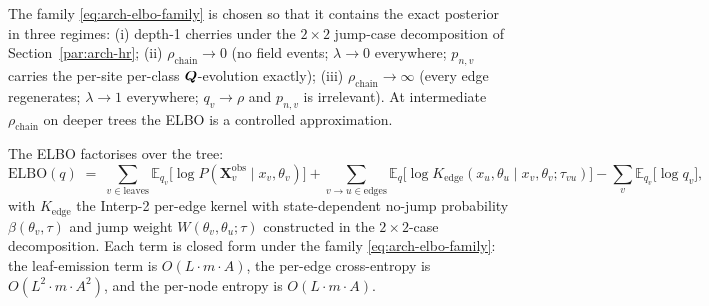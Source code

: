 The family \eqref{eq:arch-elbo-family} is chosen so that it contains
the exact posterior in three regimes: (i) depth-1 cherries under the
$2 \times 2$ jump-case decomposition of
Section~\ref{par:arch-hr}; (ii) $\rho_{\text{chain}} \to 0$ (no field
events; $\lambda \to 0$ everywhere; $p_{n, v}$ carries the per-site
per-class $\bm{Q}$-evolution exactly); (iii) $\rho_{\text{chain}} \to
\infty$ (every edge regenerates; $\lambda \to 1$ everywhere; $q_v \to
\rho$ and $p_{n, v}$ is irrelevant). At intermediate
$\rho_{\text{chain}}$ on deeper trees the ELBO is a controlled
approximation.

The ELBO factorises over the tree:
\begin{equation}
  \mathrm{ELBO}(q) \;=\;
    \sum_{v \in \mathrm{leaves}} \mathbb{E}_{q_v}\bigl[\log P(\mathbf{X}^{\mathrm{obs}}_v \mid x_v, \theta_v)\bigr]
    + \sum_{v \to u \in \mathrm{edges}} \mathbb{E}_q\bigl[\log K_{\mathrm{edge}}(x_u, \theta_u \mid x_v, \theta_v; \tau_{vu})\bigr]
    - \sum_{v} \mathbb{E}_{q_v}\bigl[\log q_v\bigr],
  \label{eq:arch-elbo-total}
\end{equation}
with $K_{\mathrm{edge}}$ the Interp-2 per-edge kernel with
state-dependent no-jump probability $\beta(\theta_v, \tau)$ and jump
weight $W(\theta_v, \theta_u; \tau)$ constructed in the
$2\times 2$-case decomposition. Each term is closed form under the
family \eqref{eq:arch-elbo-family}: the leaf-emission term is
$O(L \cdot m \cdot A)$, the per-edge cross-entropy is $O(L^2
\cdot m \cdot A^2)$, and the per-node entropy is $O(L \cdot
m \cdot A)$.

